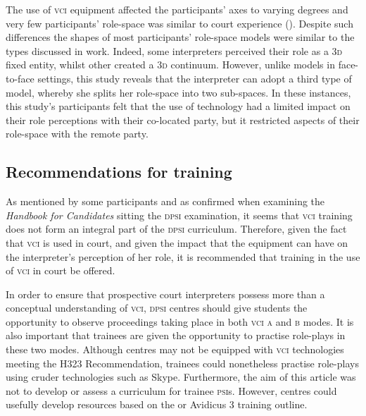 \documentclass[output=paper]{langsci/langscibook}
\begin{document}
The use of \textsc{vci} equipment affected the participants’ axes to varying degrees and very few participants’ role-space was similar to 
 court experience (). Despite such differences the shapes of most participants’ role-space models were similar to the types discussed in  work. Indeed, some interpreters perceived their role as a \textsc{3d} fixed entity, whilst other created a \textsc{3d} continuum. However, unlike  models in face-to-face settings, this study reveals that the interpreter can adopt a third type of model, whereby she splits her role-space into two sub-spaces. In these instances, this study’s participants felt that the use of technology had a limited impact on their role perceptions with their co-located party, but it restricted aspects of their role-space with the remote party. 

\subsection{Recommendations for training}
As mentioned by some participants and as confirmed when examining the  \textit{Handbook for Candidates} sitting the \textsc{dpsi} examination, it seems that \textsc{vci} training does not form an integral part of the \textsc{dpsi} curriculum. Therefore, given the fact that \textsc{vci} is used in court, and given the impact that the equipment can have on the interpreter’s perception of her role, it is recommended that training in the use of \textsc{vci} in court be offered.  

In order to ensure that prospective court interpreters possess more than a conceptual understanding of \textsc{vci}, \textsc{dpsi} centres should give students the opportunity to observe proceedings taking place in both \textsc{vci a} and \textsc{b} modes. It is also important that trainees are given the opportunity to practise role-plays in these two modes. Although centres may not be equipped with \textsc{vci} technologies meeting the  H323 Recommendation, trainees could nonetheless practise role-plays using cruder technologies such as Skype. Furthermore, the aim of this article was not to develop or assess a curriculum for trainee \textsc{psi}s. However, centres could usefully develop resources based on the \citet{Braun2011c} or Avidicus 3 training outline. 
\end{document}
